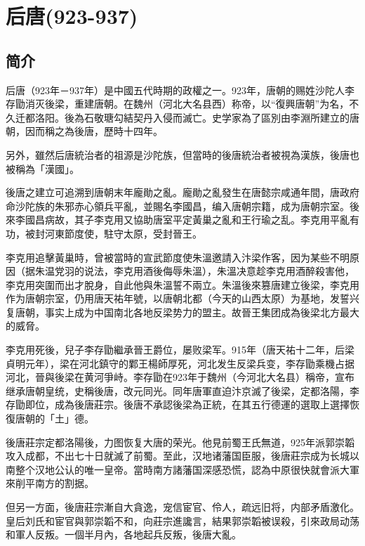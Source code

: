 

\section{后唐\tiny(923-937)}

\subsection{简介}

后唐（923年－937年）是中國五代時期的政權之一。923年，唐朝的赐姓沙陀人李存勖消灭後梁，重建唐朝。在魏州（河北大名县西）称帝，以“復興唐朝”为名，不久迁都洛阳。後為石敬瑭勾結契丹入侵而滅亡。史学家為了區別由李淵所建立的唐朝，因而稱之為後唐，歷時十四年。

另外，雖然后唐統治者的祖源是沙陀族，但當時的後唐統治者被視為漢族，後唐也被稱為「漢國」。

後唐之建立可追溯到唐朝末年龐勛之亂。龐勛之亂發生在唐懿宗咸通年間，唐政府命沙陀族的朱邪赤心領兵平亂，並賜名李國昌，编入唐朝宗籍，成为唐朝宗室。後來李國昌病故，其子李克用又協助唐室平定黃巢之亂和王行瑜之乱。李克用平亂有功，被封河東節度使，駐守太原，受封晉王。

李克用追擊黃巢時，曾被當時的宣武節度使朱溫邀請入汴梁作客，因为某些不明原因（据朱温党羽的说法，李克用酒後侮辱朱溫），朱溫决意趁李克用酒醉殺害他，李克用突圍而出才脫身，自此他與朱溫誓不兩立。朱溫後來篡唐建立後梁，李克用作为唐朝宗室，仍用唐天祐年號，以唐朝北都（今天的山西太原）为基地，发誓兴复唐朝，事实上成为中国南北各地反梁势力的盟主。故晉王集团成為後梁北方最大的威脅。

李克用死後，兒子李存勖繼承晉王爵位，屡败梁军。915年（唐天祐十二年，后梁貞明元年），梁在河北鎮守的鄴王楊師厚死，河北发生反梁兵变，李存勖乘機占据河北，晉與後梁在黄河爭峙。李存勖在923年于魏州（今河北大名县）稱帝，宣布继承唐朝皇统，史稱後唐，改元同光。同年唐軍直迫汴京滅了後梁，定都洛陽，李存勖即位，成為後唐莊宗。後唐不承認後梁為正統，在其五行德運的選取上選擇恢復唐朝的「土」德。

後唐莊宗定都洛陽後，力图恢复大唐的荣光。他見前蜀王氏無道，925年派郭崇韜攻入成都，不出七十日就滅了前蜀。至此，汉地诸藩国臣服，後唐莊宗成为长城以南整个汉地公认的唯一皇帝。當時南方諸藩国深感恐慌，認為中原很快就會派大軍來削平南方的割据。

但另一方面，後唐莊宗漸自大貪逸，宠信宦官、伶人，疏远旧将，内部矛盾激化。皇后刘氏和宦官與郭崇韜不和，向莊宗進讒言，結果郭崇韜被误殺，引來政局动荡和軍人反叛。一個半月內，各地起兵反叛，後唐大亂。

